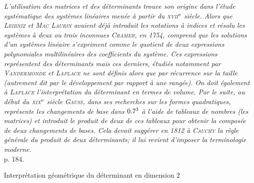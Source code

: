 \textsl{L'utilisation des matrices et des déterminants trouve son origine dans l'étude systématique des systèmes linéaires menée à partir du \textsc{xvii}$^{\mathrm{e}}$ siècle. Alors que \textsc{Leibniz} et \textsc{Mac Laurin} avaient déjà introduit les notations à indices et résolu les systèmes à deux ou trois inconnues \textsc{Cramer}, en 1754, comprend que les solutions d'un systèmes linéaire s'expriment comme le quotient de deux expressions polynomiales multilinéaires des coefficients du système. Ces expressions représentent des déterminants mais ces derniers, étudiés notamment par \textsc{Vandermonde} et \textsc{Laplace} ne sont définis alors que par récurrence sur la taille (autrement dit par le développement par rapport à une rangée). On doit également à \textsc{Laplace} l'interprétation du déterminant en termes de volume. Par le suite, au début du \textsc{xix}$^{\mathrm{e}}$ siècle \textsc{Gauss}, dans ses recherches sur les formes quadratiques, représente les changements de base dans $0.7^3$ à l'aide de tableaux de nombres (les matrices) et introduit le produit de deux de ces tableaux pour obtenir la composée de deux changements de bases. Cela devait suggérer en 1812 à \textsc{Cauchy} la règle générale du produit de deux déterminants; il lui revient d'imposer la terminologie moderne.} \\

\cite{objectif_agregation} p. 184.

\begin{marginfigure}[-7.6cm]
    \caption*{\centering Interprétation géométrique du déterminant en dimension $2$}
   
\end{marginfigure}

